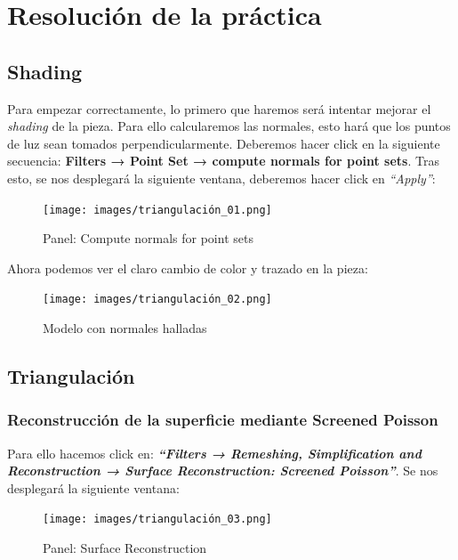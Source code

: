 \documentclass[options]{article}
\begin{document}
\pagebreak

\section{Resolución de la práctica}
\subsection{Shading}

Para empezar correctamente, lo primero que haremos será intentar mejorar el \textit{shading} de la pieza. Para ello calcularemos las normales, esto hará que los puntos de luz sean tomados perpendicularmente. Deberemos hacer click en la siguiente secuencia: \textbf{Filters → Point Set → compute normals for point sets}. Tras esto, se nos desplegará la siguiente ventana, deberemos hacer click en \textit{``Apply''}:

\begin{figure}[H]
    \centering
    \texttt{[image: images/triangulación\_01.png]}
    \caption{Panel: Compute normals for point sets}
\end{figure}

\pagebreak

Ahora podemos ver el claro cambio de color y trazado en la pieza:

\begin{figure}[H]
    \centering
    \texttt{[image: images/triangulación\_02.png]}
    \caption{Modelo con normales halladas}
\end{figure}

\pagebreak

\subsection{Triangulación}

\subsubsection{Reconstrucción de la superficie mediante Screened Poisson}
Para ello hacemos click en: \textbf{\textit{``Filters → Remeshing, Simplification and Reconstruction → Surface Reconstruction: Screened Poisson''}}. Se nos desplegará la siguiente ventana:

\begin{figure}[H]
    \centering
    \texttt{[image: images/triangulación\_03.png]}
    \caption{Panel: Surface Reconstruction}
\end{figure}
\end{document}

